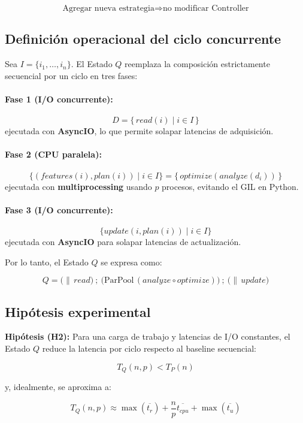 \documentclass[12pt]{article}
\begin{document}
\[
\text{Agregar nueva estrategia} \Rightarrow \text{no modificar Controller}
\]

\subsection{Definición operacional del ciclo concurrente}

Sea \(I=\{i_1,\dots,i_n\}\). El Estado \(Q\) reemplaza la composición estrictamente secuencial por un ciclo en tres fases:

\paragraph{Fase 1 (I/O concurrente):}
\[
D = \{\,read(i)\mid i\in I\,\}
\]
ejecutada con \textbf{AsyncIO}, lo que permite solapar latencias de adquisición.

\paragraph{Fase 2 (CPU paralela):}
\[
\{(features(i),plan(i))\mid i\in I\} = \{\,optimize(analyze(d_i))\,\}
\]
ejecutada con \textbf{multiprocessing} usando \(p\) procesos, evitando el GIL en Python.

\paragraph{Fase 3 (I/O concurrente):}
\[
\{update(i,plan(i))\mid i\in I\}
\]
ejecutada con \textbf{AsyncIO} para solapar latencias de actualización.

Por lo tanto, el Estado \(Q\) se expresa como:

\[
Q = \Big(\parallel\, read\Big)\ ;\ \Big(\text{ParPool}\, (analyze\circ optimize)\Big)\ ;\ \Big(\parallel\, update\Big)
\]

\subsection{Hipótesis experimental}

\textbf{Hipótesis (H2):} Para una carga de trabajo y latencias de I/O constantes, el Estado \(Q\) reduce
la latencia por ciclo respecto al baseline secuencial:

\[
T_Q(n,p) < T_P(n)
\]

y, idealmente, se aproxima a:

\[
T_Q(n,p) \approx \max(\overline{t_r}) + \frac{n}{p}\overline{t_{cpu}} + \max(\overline{t_u})
\]
\end{document}
